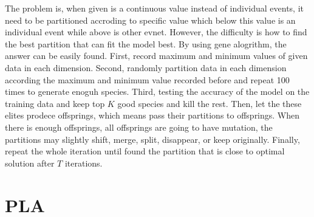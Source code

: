 \documentclass[twocolumn,10pt]{article}
\begin{document}
  The problem is, when given is a continuous value instead of individual events, it need to be partitioned accroding to specific value 
  which below this value is an individual event while above is other evnet. However, the difficulty is how to find the best partition 
  that can fit the model best. By using gene alogrithm, the answer can be easily found. First, record maximum and minimum values of 
  given data in each dimension. Second, randomly partition data in each dimension according the maximum and minimum value recorded before 
  and repeat 100 times to generate enoguh species. Third, testing the accuracy of the model on the training data and keep top $K$ 
  good species and kill the rest. Then, let the these elites prodece offsprings, which means pass their partitions to offsprings. 
  When there is enough offsprings, all offsprings are going to have mutation, the partitions may slightly shift, 
  merge, split, disappear, or keep originally. Finally, repeat the whole iteration until found the partition that is close to optimal 
  solution after $T$ iterations.

\section{PLA}
\end{document}
